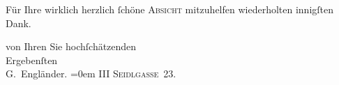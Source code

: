 \pstart
           Für Ihre wirklich herzlich ſchöne \textsc{Absicht} mitzuhelfen
               wiederholten innigſten Dank.\pend
           
\pstart
           von Ihren Sie hochſchätzenden{\\[\baselineskip]}Ergebenſten{\\[\baselineskip]}\spacefill\mbox{G. Engländer.}\pend
           \leftskip=0em{}
\pstart
           \noindent{}\textsc{III Seidlgasse 23.}\pend
           \endnumbering{}  
      